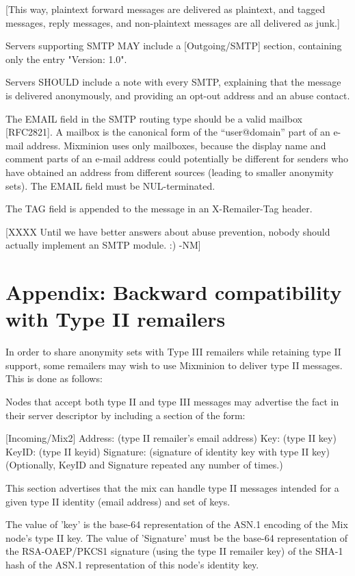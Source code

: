 [This way, plaintext forward messages are delivered as plaintext,
and tagged messages, reply messages, and non-plaintext messages are
all delivered as junk.]

Servers supporting SMTP MAY include a [Outgoing/SMTP] section,
containing only the entry "Version: 1.0".

Servers SHOULD include a note with every SMTP, explaining that the
message is delivered anonymously, and providing an opt-out address and
an abuse contact.

The EMAIL field in the SMTP routing type should be a valid mailbox
[RFC2821]. A mailbox is the canonical form of the ``user@domain''
part of an e-mail address. Mixminion uses only mailboxes, because the
display name and comment parts of an e-mail address could potentially be
different for senders who have obtained an address from different
sources (leading to smaller anonymity sets). The EMAIL field must be
NUL-terminated.

The TAG field is appended to the message in an X-Remailer-Tag header.

[XXXX Until we have better answers about abuse prevention, nobody should
  actually implement an SMTP module. :) -NM]

\section{Appendix: Backward compatibility with Type II remailers}

In order to share anonymity sets with Type III remailers while
retaining type II support, some remailers may wish to use Mixminion to
deliver type II messages.  This is done as follows:

Nodes that accept both type II and type III messages may advertise the
fact in their server descriptor by including a section of the form:
 
         [Incoming/Mix2]
         Address: (type II remailer's email address)
         Key: (type II key)
	 KeyID: (type II keyid)
         Signature: (signature of identity key with type II key)
	 (Optionally, KeyID and Signature repeated any number of
                      times.)

This section advertises that the mix can handle type II messages
intended for a given type II identity (email address) and set of keys.

The value of 'key' is the base-64 representation of the ASN.1 encoding
of the Mix node's type II key. The value of 'Signature' must be the
base-64 representation of the RSA-OAEP/PKCS1 signature (using the
type II remailer key) of the SHA-1 hash of the ASN.1 representation of
this node's identity key.

